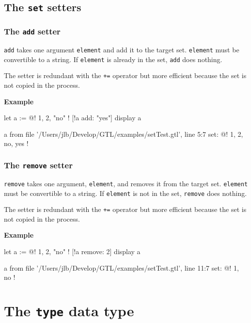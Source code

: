 \documentclass[10pt,openright,twosides]{report}
\newcommand{\gtlinline}[1]{\colorbox{light-blue}{\lstinline[language=gtl]{#1}}}
\newcommand{\example}{\vspace{.75em}\noindent\textbf{Example}\vspace{0em}}
\begin{document}
\subsection{The \texttt{set} setters}

\subsubsection{The \texttt{add} setter}

\gtlinline{add} takes one argument \gtlinline{element} and add it to the target set. \gtlinline{element} must be convertible to a string. If \gtlinline{element} is already in the set, \gtlinline{add} does nothing.

The setter is redundant with the \gtlinline{+=} operator but more efficient because the set is not copied in the process.

\example
\begin{gtl}
let a := @! 1, 2, "no" !
[!a add: "yes"]
display a
\end{gtl}
\begin{console}
a from file '/Users/jlb/Develop/GTL/examples/setTest.gtl', line 5:7
    set: @!
        1, 2, no, yes
    !
\end{console}

\subsubsection{The \texttt{remove} setter}

\gtlinline{remove} takes one argument, \gtlinline{element}, and removes it from the target set. \gtlinline{element} must be convertible to a string. If \gtlinline{element} is not in the set, \gtlinline{remove} does nothing.

The setter is redundant with the \gtlinline{+=} operator but more efficient because the set is not copied in the process.

\example
\begin{gtl}
let a := @! 1, 2, "no" !
[!a remove: 2]
display a
\end{gtl}
\begin{console}
a from file '/Users/jlb/Develop/GTL/examples/setTest.gtl', line 11:7
    set: @!
        1, no
    !
\end{console}

\section{The \texttt{type} data type}
\label{sec:type}
\end{document}

